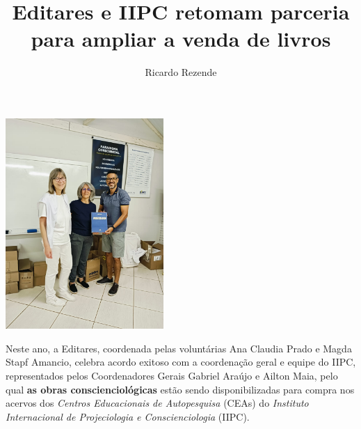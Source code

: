 \documentclass{gescons}
\author{Ricardo Rezende}
\title{Editares e IIPC retomam parceria para ampliar a venda de livros}
\begin{document}
    \makeentrevistatitle


    
    

\begin{center}
    \includegraphics[height=8cm,trim={130 200 100 300},clip]{articles/parceria/imagens/editares-iipc.jpeg}
\end{center}


    



\vspace{5mm}

Neste ano, a Editares, coordenada pelas voluntárias Ana Claudia Prado e Magda Stapf Amancio, celebra acordo exitoso com a coordenação geral e equipe do IIPC, representados pelos Coordenadores Gerais Gabriel Araújo e Ailton Maia, pelo qual \textbf{as obras conscienciológicas} estão sendo disponibilizadas para compra nos acervos dos \emph{Centros Educacionais de Autopesquisa} (CEAs) do \emph{Instituto Internacional de Projeciologia e Cons­cienciologia} (IIPC).
\end{document}
